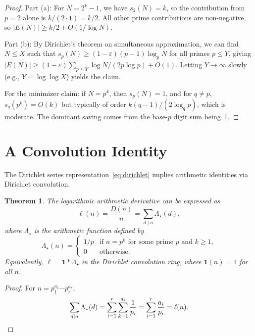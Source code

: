 \documentclass[11pt,a4paper]{amsart}
\theoremstyle{plain}
\newtheorem{theorem}{Theorem}[section]
\theoremstyle{definition}
\begin{document}
\begin{proof}
Part (a): For $N = 2^k - 1$, we have $s_2(N) = k$, so the contribution from $p = 2$ 
alone is $k/(2 \cdot 1) = k/2$.  All other prime contributions are non-negative, so 
$|E(N)| \ge k/2 + O(1/\log N)$.

Part (b): By Dirichlet's theorem on simultaneous approximation, we can find $N \le X$ 
such that $s_p(N) \ge (1-\varepsilon)(p-1)\log_p N$ for all primes $p \le Y$, 
giving $|E(N)| \ge (1-\varepsilon) \sum_{p \le Y} \log N/(2p \log p) + O(1)$.  
Letting $Y \to \infty$ slowly (e.g., $Y = \log\log X$) yields the claim.

For the minimizer claim: if $N = p^k$, then $s_p(N) = 1$, and for $q \neq p$, 
$s_q(p^k) = O(k)$ but typically of order $k(q-1)/(2\log_q p)$, which is moderate.  
The dominant saving comes from the base-$p$ digit sum being~1.
\end{proof}

\section{A Convolution Identity}

The Dirichlet series representation~\eqref{eq:dirichlet} implies arithmetic 
identities via Dirichlet convolution.

\begin{theorem}\label{thm:convolution}
The logarithmic arithmetic derivative can be expressed as
\begin{equation}\label{eq:conv}
\ell(n) = \frac{D(n)}{n} = \sum_{d \mid n} \Lambda_{\star}(d),
\end{equation}
where $\Lambda_{\star}$ is the arithmetic function defined by
\begin{equation}
\Lambda_{\star}(n) = 
\begin{cases}
1/p & \text{if } n = p^k \text{ for some prime } p \text{ and } k \ge 1, \\
0 & \text{otherwise}.
\end{cases}
\end{equation}
Equivalently, $\ell = \mathbf{1} * \Lambda_{\star}$ in the Dirichlet convolution ring, 
where $\mathbf{1}(n) = 1$ for all $n$.
\end{theorem}

\begin{proof}
For $n = p_1^{a_1} \cdots p_r^{a_r}$,
\[
\sum_{d \mid n} \Lambda_{\star}(d)
= \sum_{i=1}^{r} \sum_{k=1}^{a_i} \frac{1}{p_i}
= \sum_{i=1}^{r} \frac{a_i}{p_i}
= \ell(n). \qedhere
\]
\end{proof}
\end{document}
